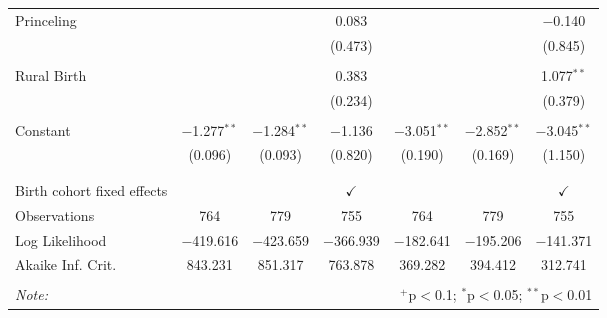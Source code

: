 \documentclass[12pt,letterpaper]{article}
\begin{document}
\begin{table}[!htbp]
\begin{tabular}{@{\extracolsep{5pt}}lcccccc}
		Princeling &  &  & 0.083 &  &  & $-$0.140 \\ 
		&  &  & (0.473) &  &  & (0.845) \\ 
		& & & & & & \\ 
		Rural Birth &  &  & 0.383 &  &  & 1.077$^{**}$ \\ 
		&  &  & (0.234) &  &  & (0.379) \\ 
		& & & & & & \\ 
		Constant & $-$1.277$^{**}$ & $-$1.284$^{**}$ & $-$1.136 & $-$3.051$^{**}$ & $-$2.852$^{**}$ & $-$3.045$^{**}$ \\ 
		& (0.096) & (0.093) & (0.820) & (0.190) & (0.169) & (1.150) \\ 
		& & & & & & \\ 
		\hline \\[-1.8ex] 
		Birth cohort fixed effects &  &  & $\checkmark$ &  &  & $\checkmark$ \\ 
		Observations & 764 & 779 & 755 & 764 & 779 & 755 \\ 
		Log Likelihood & $-$419.616 & $-$423.659 & $-$366.939 & $-$182.641 & $-$195.206 & $-$141.371 \\ 
		Akaike Inf. Crit. & 843.231 & 851.317 & 763.878 & 369.282 & 394.412 & 312.741 \\ 
		\hline 
		\hline \\[-1.8ex] 
		\textit{Note:}  & \multicolumn{6}{r}{$^{+}$p$<$0.1; $^{*}$p$<$0.05; $^{**}$p$<$0.01}} \\ 
\end{tabular} 
\end{table} 
\end{document}
